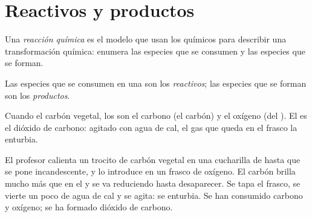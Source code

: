 \section{Reactivos y productos}

\begin{definition}\label{def:g7:chemical-reactions:reaction}
Una \emph{reacción química} es el modelo que
usan los químicos para describir una transformación química: enumera
las especies que se consumen y las especies que se forman.
\end{definition}

\begin{definition}\label{def:g7:chemical-reactions:reactant}
Las especies que se consumen en una  son los
\emph{reactivos}; las especies que se forman son los
\emph{productos}.
\end{definition}

\begin{example}\label{ex:g7:chemical-reactions:carbon}
Cuando  el carbón vegetal, los  son el carbono (el carbón)
y el oxígeno (del ). El  es el dióxido de carbono: agitado
con agua de cal, el gas que queda en el frasco la enturbia.
\end{example}

\begin{inthelab}
El profesor calienta un trocito de carbón vegetal en una cucharilla de
 hasta que se pone incandescente, y lo introduce en un frasco
de oxígeno. El carbón brilla mucho más que en el  y se va
reduciendo hasta desaparecer. Se tapa el frasco, se vierte un poco de
agua de cal y se agita: se enturbia. Se han consumido carbono y oxígeno;
se ha formado dióxido de carbono.
\end{inthelab}

